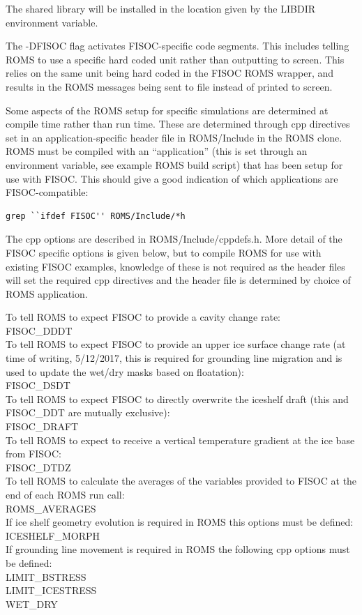 \documentclass[12pt]{article}
\begin{document}
The shared library will be installed in the location given by the 
 LIBDIR environment variable. 

The -DFISOC flag activates FISOC-specific code segments.  
This includes telling ROMS to use a 
specific hard coded unit rather than outputting to screen.  This relies on the 
same unit being hard coded in the FISOC ROMS wrapper, and results in the ROMS 
messages being sent to file instead of printed to screen.

Some aspects of the ROMS setup for specific simulations are determined at 
compile time rather than run time. 
These are determined through cpp directives set in an application-specific 
header file in ROMS/Include in the ROMS clone. 
ROMS must be compiled with an ``application'' (this is set through an 
environment variable, see example ROMS build script) that has been setup for 
use with FISOC. 
This should give a good indication of which applications are FISOC-compatible:
\begin{lstlisting}
grep ``ifdef FISOC'' ROMS/Include/*h
\end{lstlisting}

The cpp options are described in ROMS/Include/cppdefs.h. 
More detail of the FISOC specific options is given below, but to compile ROMS 
for use with 
existing FISOC examples, knowledge of these is not required as the header 
files will set the required cpp directives and the header file is determined by 
choice of ROMS application.

\begin{flushleft}
To tell ROMS to expect FISOC to provide a cavity change rate:\\
FISOC\_DDDT\\
To tell ROMS to expect FISOC to provide an upper ice surface change rate
(at time of writing, 5/12/2017, this is required for grounding line migration 
and is used to update the wet/dry masks based on floatation):\\
FISOC\_DSDT\\
To tell ROMS to expect FISOC to directly overwrite the iceshelf draft 
(this and FISOC\_DDT are mutually exclusive):\\
FISOC\_DRAFT\\
To tell ROMS to expect to receive a vertical temperature gradient 
at the ice base from FISOC: \\
FISOC\_DTDZ\\
To tell ROMS to calculate the averages of the variables provided to FISOC at 
the end of each ROMS run call:\\
ROMS\_AVERAGES\\
If ice shelf geometry evolution is required in ROMS this options must be 
defined:\\
ICESHELF\_MORPH\\
If grounding line movement is required in ROMS the following cpp options 
must be defined:\\
LIMIT\_BSTRESS\\
LIMIT\_ICESTRESS\\
WET\_DRY
\end{flushleft}
\end{document}
